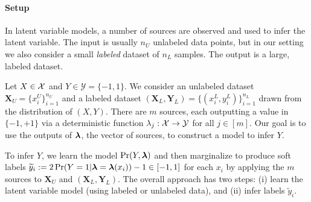 
\paragraph{Setup} In latent variable models, a number of sources are observed and used to infer the latent variable.
The input is usually $n_U$ unlabeled data points, but in our setting we also consider a small \emph{labeled} dataset of $n_L$ samples. The output is a large, labeled dataset.

Let $X \in \mathcal{X}$ and $Y \in \mathcal{Y} = \{-1, 1\}$. We consider an unlabeled dataset $\bm{X}_U = \{x_i^U\}_{i = 1}^{n_U}$ and a labeled dataset $(\bm{X}_L, \bm{Y}_L) = \{(x_i^L, y_i^L) \}_{i = 1}^{n_L}$ drawn from the distribution of $(X, Y)$.
There are $m$ sources, each
outputting a value in $\{-1, +1\}$ via a deterministic function
$\lambda_j: \mathcal{X} \rightarrow \mathcal{Y}$ for all
$j \in [m]$. %
Our goal is to use the outputs of $\bm{\lambda}$, the vector of sources, to construct a model to infer $Y$.

To infer $Y$, we learn the model $\Pr(Y, \bm{\lambda})$ and then marginalize to produce soft labels $\widetilde{y}_i := 2 \Pr(Y = 1 | \bm{\lambda} = \bm{\lambda}(x_i)) - 1 \in [-1, 1]$ for each $x_i$ by applying
the $m$ sources to $\bm{X}_U$ and $(\bm{X}_L, \bm{Y}_L)$. The overall approach has two steps: (i) learn the latent variable model (using labeled or unlabeled data), and (ii) infer labels $\tilde{y}_i$.


